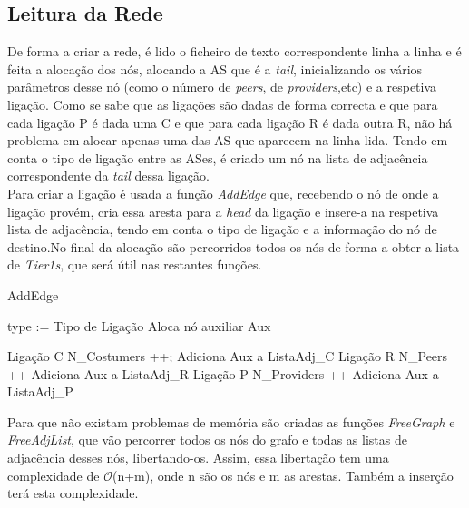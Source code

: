 \documentclass[twocolumn]{article} %
\begin{document}
		\subsection{Leitura da Rede}

			De forma a criar a rede, é lido o ficheiro de texto correspondente linha a linha e é feita a alocação dos nós, alocando a AS que é a \emph{tail}, inicializando os vários parâmetros desse nó (como o número de \emph{peers}, de \emph{providers},etc) e a respetiva ligação. Como se sabe que as ligações são dadas de forma correcta e que para cada ligação P é dada uma C e que para cada ligação R é dada outra R, não há problema em alocar apenas uma das AS que aparecem na linha lida. Tendo em conta o tipo de ligação entre as ASes, é criado um nó na lista de adjacência correspondente da \emph{tail} dessa ligação.\\

			\noindent Para criar a ligação é usada a função \emph{AddEdge} que, recebendo o nó de onde a ligação provém, cria essa aresta para a \emph{head} da ligação e insere-a na respetiva lista de adjacência, tendo em conta o tipo de ligação e a informação do nó de destino.No final da alocação são percorridos todos os nós de forma a obter a lista de \emph{Tier1s}, que será útil nas restantes funções.

			\begin{algorithm}[htbp]
			\caption{AddEdge}
			\begin{algorithmic}[1]
				
				\State type := Tipo de Ligação
				\State Aloca nó auxiliar Aux

					\State Ligação C
					\State N\_Costumers ++;
					\State Adiciona Aux a ListaAdj\_C
				\Else
						\State Ligação R
						\State N\_Peers ++
						\State Adiciona Aux a ListaAdj\_R
					\Else
						\State Ligação P
						\State N\_Providers ++
						\State Adiciona Aux a ListaAdj\_P
					\EndIf
				\EndIf

			\end{algorithmic}
			\end{algorithm}

			\noindent Para que não existam problemas de memória são criadas as funções \emph{FreeGraph} e \emph{FreeAdjList}, que vão percorrer todos os nós do grafo e todas as listas de adjacência desses nós, libertando-os. Assim, essa libertação tem uma complexidade de $\mathcal{O}$(n+m), onde n são os nós e m as arestas. Também a inserção terá esta complexidade.
\end{document}

